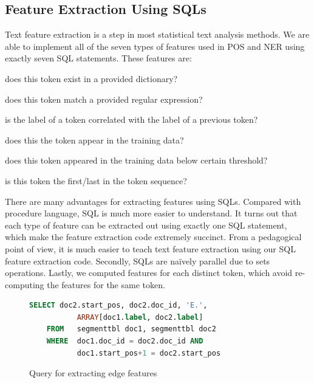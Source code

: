 \documentclass[11pt,letterpaper]{article}
\begin{document}
\subsection{Feature Extraction Using SQLs}
Text feature extraction is a step in most statistical text analysis methods.
We are able to implement all of the seven types of features used in POS and NER using exactly seven 
SQL statements. These features are: 
\begin{description}[noitemsep]
\item[Dictionary features] does this token exist in a provided dictionary? 
\item[Regex feature:] does this token match a provided regular expression? 
\item[Edge feature:] is the label of a token correlated with the label of a previous token? 
\item[Word feature:] does this the token appear in the training data?
\item[Unknown feature:] does this token appeared in the training data below certain threshold? 
\item[Start feature and End feature:] is this token the first/last in the token sequence?
\end{description}

There are many advantages for extracting features using SQLs.  
Compared with procedure language, SQL is much more easier to understand. 
It turns out that each type of feature can be extracted out using exactly one SQL statement, 
which make the feature extraction code extremely succinct.  
From a pedagogical point of view, it is much easier to teach text feature extraction using our SQL feature extraction code.
Secondly, SQLs are naïvely parallel due to sets operations. 
Lastly, we computed features for each distinct token, which avoid re-computing the features for the same token.  
\begin{figure}
\centering
\begin{lstlisting}[language=SQL,gobble=4, breaklines=true]
    SELECT doc2.start_pos, doc2.doc_id, 'E.', 
           ARRAY[doc1.label, doc2.label]
    FROM   segmenttbl doc1, segmenttbl doc2
    WHERE  doc1.doc_id = doc2.doc_id AND 
           doc1.start_pos+1 = doc2.start_pos
\end{lstlisting}
\caption{Query for extracting edge features}
\end{figure}
\end{document}
